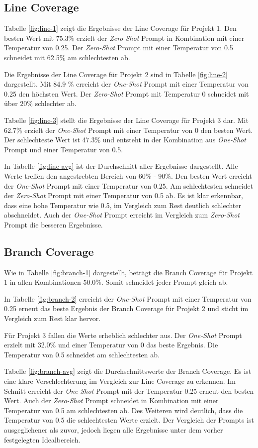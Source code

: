\subsection{Line Coverage}
Tabelle \ref{fig:line-1} zeigt die Ergebnisse der Line Coverage für Projekt 1. Den besten Wert mit 75.3\% erzielt der \textit{Zero Shot} Prompt in Kombination mit einer Temperatur von 0.25. Der \textit{Zero-Shot} Prompt mit einer Temperatur von 0.5 schneidet mit 62.5\% am schlechtesten ab.

Die Ergebnisse der Line Coverage für Projekt 2 sind in Tabelle \ref{fig:line-2} dargestellt. Mit 84.9 \% erreicht der \textit{One-Shot} Prompt mit einer Temperatur von 0.25 den höchsten Wert. Der \textit{Zero-Shot} Prompt mit Temperatur 0 schneidet mit über 20\% schlechter ab.

Tabelle \ref{fig:line-3} stellt die Ergebnisse der Line Coverage für Projekt 3 dar. Mit 62.7\% erzielt der \textit{One-Shot} Prompt mit einer Temperatur von 0 den besten Wert. Der schlechteste Wert ist 47.3\% und entsteht in der Kombination aus \textit{One-Shot} Prompt und einer Temperatur von 0.5.

In Tabelle \ref{fig:line-avg} ist der Durchschnitt aller Ergebnisse dargestellt. Alle Werte treffen den angestrebten Bereich von 60\% - 90\%. Den besten Wert erreicht der \textit{One-Shot} Prompt mit einer Temperatur von 0.25. Am schlechtesten schneidet der \textit{Zero-Shot} Prompt mit einer Temperatur von 0.5 ab. Es ist klar erkennbar, dass eine hohe Temperatur wie 0.5, im Vergleich zum Rest deutlich schlechter abschneidet. Auch der \textit{One-Shot} Prompt erreicht im Vergleich zum \textit{Zero-Shot} Prompt die besseren Ergebnisse. 


\subsection{Branch Coverage}
Wie in Tabelle \ref{fig:branch-1} dargestellt, beträgt die Branch Coverage für Projekt 1 in allen Kombinationen 50.0\%. Somit schneidet jeder Prompt gleich ab.

In Tabelle \ref{fig:branch-2} erreicht der \textit{One-Shot} Prompt mit einer Temperatur von 0.25 erneut das beste Ergebnis der Branch Coverage für Projekt 2 und sticht im Vergleich zum Rest klar hervor.

Für Projekt 3 fallen die Werte erheblich schlechter aus. Der \textit{One-Shot} Prompt erzielt mit 32.0\% und einer Temperatur von 0 das beste Ergebnis. Die Temperatur von 0.5 schneidet am schlechtesten ab.

Tabelle \ref{fig:branch-avg} zeigt die Durchschnittswerte der Branch Coverage. Es ist eine klare Verschlechterung im Vergleich zur Line Coverage zu erkennen. Im Schnitt erreicht der \textit{One-Shot} Prompt mit der Temperatur 0.25 erneut den besten Wert. Auch der \textit{Zero-Shot} Prompt schneidet in Kombination mit einer Temperatur von 0.5 am schlechtesten ab. Des Weiteren wird deutlich, dass die Temperatur von 0.5 die schlechtesten Werte erzielt. Der Vergleich der Prompts ist ausgeglichener als zuvor, jedoch liegen alle Ergebnisse unter dem vorher festgelegten Idealbereich. 


